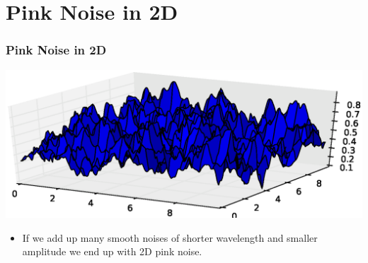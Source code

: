 \documentclass[slidestop,xcolor=pst]{beamer}
\newcommand{\sect}[1]{
\section{#1}
\begin{frame}[fragile]\frametitle{#1}
}
\begin{document}
\sect{Pink Noise in 2D}
\includegraphics[width=\textwidth]{pinknoisesurface.eps}
\begin{itemize}
\item If we add up many smooth noises of shorter wavelength and
  smaller amplitude we end up with 2D pink noise.

\end{itemize}
\end{frame}
\end{document}
